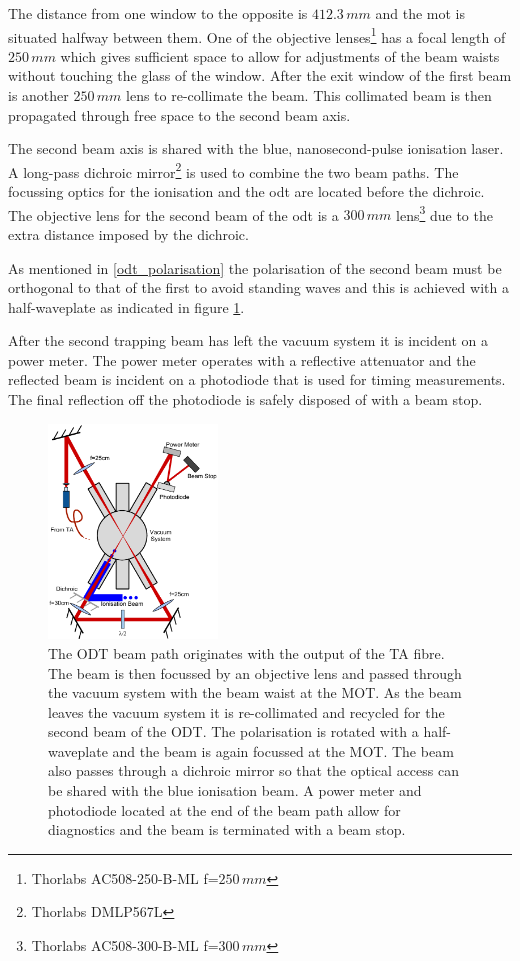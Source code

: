 The distance from one window to the opposite is $412.3\,\unit{mm}$ and the \gls{mot} is situated halfway between them. One of the objective lenses\footnote{Thorlabs AC508-250-B-ML f=$250\,\unit{mm}$} has a focal length of $250\,\unit{mm}$ which gives sufficient space to allow for adjustments of the beam waists without touching the glass of the window. After the exit window of the first beam is another $250\,\unit{mm}$ lens to re-collimate the beam. This collimated beam is then propagated through free space to the second beam axis.

The second beam axis is shared with the blue, nanosecond-pulse ionisation laser. A long-pass dichroic mirror\footnote{Thorlabs DMLP567L} is used to combine the two beam paths. The focussing optics for the ionisation and the \gls{odt} are located before the dichroic. The objective lens for the second beam of the \gls{odt} is a $300\,\unit{mm}$ lens\footnote{Thorlabs AC508-300-B-ML f=$300\,\unit{mm}$} due to the extra distance imposed by the dichroic.

As mentioned in \ref{odt_polarisation} the polarisation of the second beam must be orthogonal to that of the first to avoid standing waves and this is achieved with a half-waveplate as indicated in figure \ref{fig:dipole_rig}.

After the second trapping beam has left the vacuum system it is incident on a power meter. The power meter operates with a reflective attenuator and the reflected beam is incident on a photodiode that is used for timing measurements. The final reflection off the photodiode is safely disposed of with a beam stop.

\begin{figure}[h]
\centering
\includegraphics[width=0.4\textwidth]{figs/DipoleTrapRig.pdf}
\caption{The ODT beam path originates with the output of the TA fibre. The beam is then focussed by an objective lens and passed through the vacuum system with the beam waist at the MOT. As the beam leaves the vacuum system it is re-collimated and recycled for the second beam of the ODT. The polarisation is rotated with a half-waveplate and the beam is again focussed at the MOT. The beam also passes through a dichroic mirror so that the optical access can be shared with the blue ionisation beam. A power meter and photodiode located at the end of the beam path allow for diagnostics and the beam is terminated with a beam stop.}
\label{fig:dipole_rig}
\end{figure}

